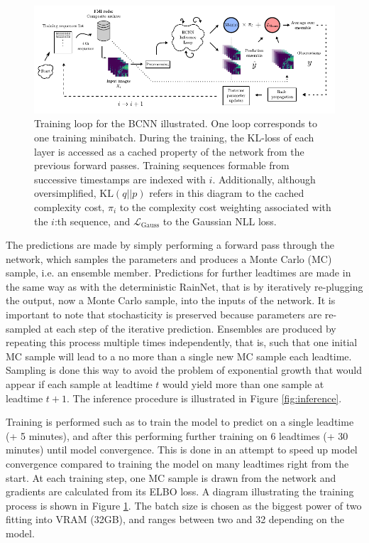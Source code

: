 \begin{figure}[ht]
	\begin{center}
		\includegraphics[scale=1]{images/training_diagram/training_diagram.pdf}
		\caption{Training loop for the BCNN illustrated. One loop corresponds to one training minibatch. During the training, the KL-loss of each layer is accessed as a cached property of the network from the previous forward passes. Training sequences formable from successive timestamps are indexed with $i$. Additionally, although oversimplified, $\text{KL}(q||p)$ refers in this diagram to the cached complexity cost, $\pi_i$ to the complexity cost weighting associated with the $i$:th sequence, and $\mathcal{L}_{\text{Gauss}}$ to the Gaussian NLL loss.}
		\label{fig:training}
	\end{center}
\end{figure}


The predictions are made by simply performing a forward pass through the network, which samples the parameters and produces a Monte Carlo (MC) sample, i.e. an ensemble member. Predictions for further leadtimes are made in the same way as with the deterministic RainNet, that is by iteratively re-plugging the output, now a Monte Carlo sample, into the inputs of the network. It is important to note that stochasticity is preserved because parameters are re-sampled at each step of the iterative prediction. Ensembles are produced by repeating this process multiple times independently, that is, such that one initial MC sample will lead to a no more than a single new MC sample each leadtime. Sampling is done this way to avoid the problem of exponential growth that would appear if each sample at leadtime $t$ would yield more than one sample at leadtime $t+1$. The inference procedure is illustrated in Figure \ref{fig:inference}.

Training is performed such as to train the model to predict on a single leadtime (+ 5 minutes), and after this performing further training on 6 leadtimes (+ 30 minutes) until model convergence. This is done in an attempt to speed up model convergence compared to training the model on many leadtimes right from the start. At each training step, one MC sample is drawn from the network and gradients are calculated from its ELBO loss. A diagram illustrating the training process is shown in Figure \ref{fig:training}. The batch size is chosen as the biggest power of two fitting into VRAM (32GB), and ranges between two and 32 depending on the model.

